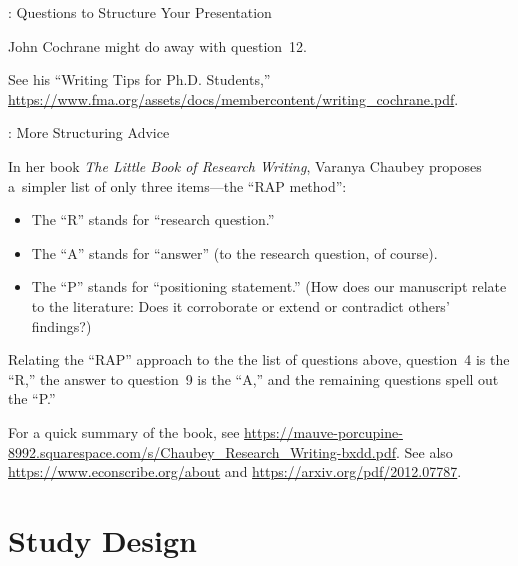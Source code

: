 \begin{frame}[allowframebreaks]{\titleprefix: Questions to Structure Your Presentation}
\framebreak

John Cochrane might do away with question~12.

See his ``Writing Tips for Ph.D. Students,'' \url{https://www.fma.org/assets/docs/membercontent/writing_cochrane.pdf}.

\end{frame}


\begin{frame}[allowframebreaks]{\titleprefix: More Structuring Advice}

In her book \textit{The Little Book of Research Writing}, Varanya Chaubey proposes a~simpler list of only three items---the \alert{``RAP method''}:
\begin{itemize}
	\item The \alert{``R''} stands for ``research question.''
	\item The \alert{``A''} stands for ``answer'' (to the research question, of course).
	\item The \alert{``P''} stands for ``positioning statement.'' (How does our manuscript relate to the literature: Does it corroborate or extend or contradict others' findings?)
\end{itemize}

Relating the ``RAP'' approach to the the list of questions above, question~4 is the ``R,'' the answer to question~9 is the ``A,'' and the remaining questions spell out the ``P.''

For a quick summary of the book, see \url{https://mauve-porcupine-8992.squarespace.com/s/Chaubey_Research_Writing-bxdd.pdf}. See also \url{https://www.econscribe.org/about} and \url{https://arxiv.org/pdf/2012.07787}.

\end{frame}


\section{Study Design}


